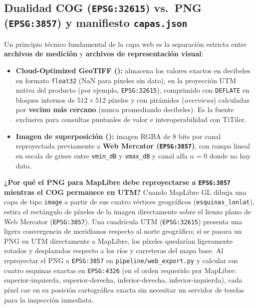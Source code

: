 \documentclass[11pt,a4paper]{article}
\newcommand{\src}[1]{\nolinkurl{#1}}
\begin{document}
\subsection{Dualidad COG (\texttt{EPSG:32615}) vs.\ PNG (\texttt{EPSG:3857}) y manifiesto \texttt{capas.json}}

Un principio técnico fundamental de la capa web es la separación estricta entre \textbf{archivos de medición}
y \textbf{archivos de representación visual}:
\begin{itemize}
  \item \textbf{Cloud-Optimized GeoTIFF ():} almacena los valores
        exactos en decibeles en formato \texttt{float32} ($\mathrm{NaN}$ para píxeles sin dato), en la proyección
        UTM nativa del producto (por ejemplo, \texttt{EPSG:32615}), comprimido con \texttt{DEFLATE} en bloques
        internos de $512\times 512$ píxeles y con pirámides (\emph{overviews}) calculadas por \textbf{vecino más
        cercano} (nunca promediando decibeles). Es la fuente exclusiva para consultas puntuales de valor e
        interoperabilidad con TiTiler.
  \item \textbf{Imagen de superposición ():} imagen RGBA de 8 bits por
        canal reproyectada previamente a \textbf{Web Mercator (\texttt{EPSG:3857})}, con rampa lineal en escala
        de grises entre \texttt{vmin\_dB} y \texttt{vmax\_dB} y canal alfa $\alpha = 0$ donde no hay dato.
\end{itemize}

\begin{intuicion}
\textbf{¿Por qué el PNG para MapLibre debe reproyectarse a \texttt{EPSG:3857} mientras el COG permanece en UTM?}
Cuando MapLibre GL dibuja una capa de tipo \texttt{image} a partir de sus cuatro vértices geográficos
(\texttt{esquinas\_lonlat}), estira el rectángulo de píxeles de la imagen directamente sobre el lienzo plano
de Web Mercator (\texttt{EPSG:3857}). Una cuadrícula UTM (\texttt{EPSG:32615}) presenta una ligera convergencia
de meridianos respecto al norte geográfico; si se pasara un PNG en UTM directamente a MapLibre, los píxeles
quedarían ligeramente rotados y desplazados respecto a los ríos y carreteras del mapa base. Al reproyectar el
PNG a \texttt{EPSG:3857} en \src{pipeline/web\_export.py} y calcular sus cuatro esquinas exactas en
\texttt{EPSG:4326} (en el orden requerido por MapLibre: superior-izquierda, superior-derecha, inferior-derecha,
inferior-izquierda), cada píxel cae en su posición cartográfica exacta sin necesitar un servidor de teselas
para la inspección inmediata.
\end{intuicion}
\end{document}
